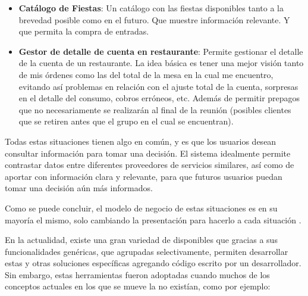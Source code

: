\begin{itemize}
	
	\item
		\textbf{Catálogo de Fiestas}: Un catálogo con las fiestas disponibles tanto a la brevedad posible como en el futuro. Que muestre información relevante. Y que permita la compra de entradas.
	
	\item
		\textbf{Gestor de detalle de cuenta en restaurante}: Permite gestionar el detalle de la cuenta de un restaurante. La idea básica es tener una mejor visión tanto de mis órdenes como las del total de la mesa en la cual me encuentro, evitando así problemas en relación con el ajuste total de la cuenta, sorpresas en el detalle del consumo, cobros erróneos, etc. Además de permitir prepagos que no necesariamente se realizarán al final de la reunión (posibles clientes que se retiren antes que el grupo en el cual se encuentran).
	
\end{itemize}

Todas estas situaciones tienen algo en común, y es que los usuarios desean consultar información para tomar una decisión. El sistema idealmente permite contrastar datos entre diferentes proveedores de servicios similares, así como de aportar con información clara y relevante, para que futuros usuarios puedan tomar una decisión aún más informados.

		Como se puede concluir, el modelo de negocio de estas situaciones es en su mayoría el mismo, solo cambiando la presentación para hacerlo \adhoc a cada situación \citeAllFrameworks.

En la actualidad, existe una gran variedad de \frameworksPC disponibles que gracias a sus funcionalidades genéricas, que agrupadas selectivamente, permiten  desarrollar estas y otras soluciones específicas agregando código escrito por un desarrollador. Sin embargo, estas herramientas fueron adoptadas cuando muchos de los conceptos actuales en los que se mueve la \internetINT no existían, como por ejemplo:

